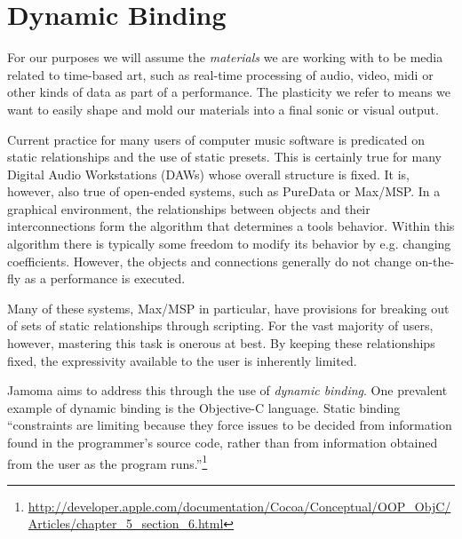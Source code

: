\documentclass{article}
\begin{document}


\section{Dynamic Binding} %
\label{sec:dynamic_binding}

For our purposes we will assume the \emph{materials} we are working with to be media related to time-based art, such as real-time processing of audio, video, midi or other kinds of data as part of a performance. The plasticity we refer to means we want to easily shape and mold our materials into a final sonic or visual output.

Current practice for many users of computer music software is predicated on static relationships and the use of static presets. This is certainly true for many Digital Audio Workstations (DAWs) whose overall structure is fixed. It is, however, also true of open-ended systems, such as PureData or Max/MSP. In a graphical environment, the relationships between objects and their interconnections form the algorithm that determines a tools behavior. Within this algorithm there is typically some freedom to modify its behavior by e.g. changing coefficients. However, the objects and connections generally do not change on-the-fly as a performance is executed.

Many of these systems, Max/MSP in particular, have provisions for breaking out of sets of static relationships through scripting. For the vast majority of users, however, mastering this task is onerous at best. By keeping these relationships fixed, the expressivity available to the user is inherently limited.

Jamoma aims to address this through the use of \emph{dynamic binding}. One prevalent example of dynamic binding is the Objective-C language. Static binding ``constraints are limiting because they force issues to be decided from information found in the programmer’s source code, rather than from information obtained from the user as the program runs.''\footnote{\url{http://developer.apple.com/documentation/Cocoa/Conceptual/OOP_ObjC/Articles/chapter_5_section_6.html}}
\end{document}
